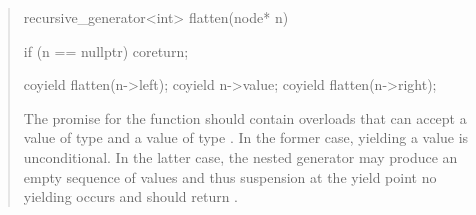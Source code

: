 \begin{quote}
\enterexample
\begin{codeblock}
  recursive_generator<int> flatten(node* n)
  {
    if (n == nullptr)
      coreturn;
    
    coyield flatten(n->left);
    coyield n->value;
    coyield flatten(n->right);
  }
\end{codeblock}

The promise for the  function should contain overloads that can accept a value of type  and a value of type .
In the former case, yielding a value is unconditional. In the latter case, the nested generator may produce an empty sequence of values and thus suspension at the yield point no yielding occurs and   should return . 
\exitexample
\exitnote

\end{quote}